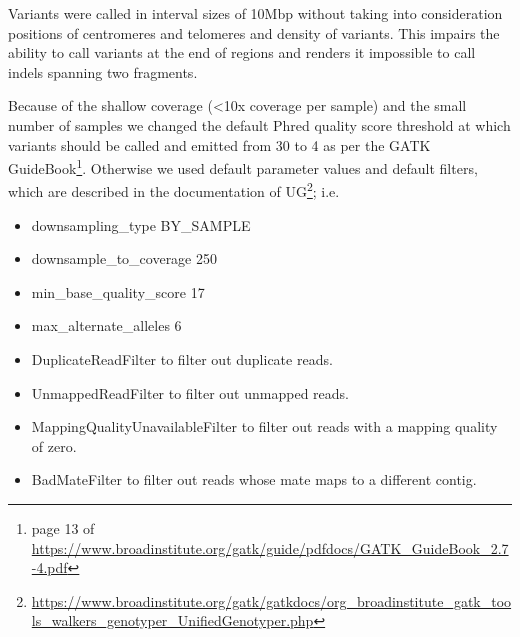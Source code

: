 Variants were called in interval sizes of 10\gls{Mbp} without taking into consideration positions of centromeres and telomeres and density of variants. This impairs the ability to call variants at the end of regions and renders it impossible to call indels spanning two fragments.

Because of the shallow coverage (\textless 10x coverage per sample) and the small
number of samples we changed the default Phred quality score threshold at which variants should be called and emitted from 30 to 4 as per the \gls{GATK} GuideBook\footnote{page 13 of \url{https://www.broadinstitute.org/gatk/guide/pdfdocs/GATK_GuideBook_2.7-4.pdf}}. Otherwise we used default parameter values and default filters, which are described in the documentation of \gls{UG}\footnote{\url{https://www.broadinstitute.org/gatk/gatkdocs/org_broadinstitute_gatk_tools_walkers_genotyper_UnifiedGenotyper.php}}; i.e.
\begin{itemize}
\item \-\-downsampling\_type BY\_SAMPLE
\item \-\-downsample\_to\_coverage 250
\item \-\-min\_base\_quality\_score 17
\item \-\-max\_alternate\_alleles 6
\item DuplicateReadFilter to filter out duplicate reads.
\item UnmappedReadFilter to filter out unmapped reads.
\item MappingQualityUnavailableFilter to filter out reads with a mapping quality of zero.
\item BadMateFilter to filter out reads whose mate maps to a different contig.
\end{itemize}

